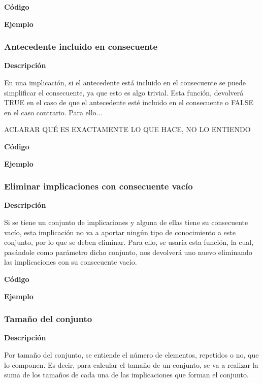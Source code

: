     \textbf{C\'odigo}



    \textbf{Ejemplo}



\subsubsection{Antecedente incluido en consecuente}

    \textbf{Descripci\'on}

    En una implicaci\'on, si el antecedente est\'a incluido en el consecuente se puede simplificar el consecuente, ya que 
    esto es algo trivial. Esta funci\'on, devolver\'a TRUE en el caso de que el antecedente est\'e incluido en el consecuente o 
    FALSE en el caso contrario. Para ello...

    ACLARAR QU\'E ES EXACTAMENTE LO QUE HACE, NO LO ENTIENDO

    \textbf{C\'odigo}


    \textbf{Ejemplo}


\subsubsection{Eliminar implicaciones con consecuente vac\'io}

    \textbf{Descripci\'on}

    Si se tiene un conjunto de implicaciones y alguna de ellas tiene su consecuente vac\'io, esta implicaci\'on no va a 
    aportar ning\'un tipo de conocimiento a este conjunto, por lo que se deben eliminar. Para ello, se usar\'ia esta funci\'on, 
    la cual, pas\'andole como par\'ametro dicho conjunto, nos devolver\'a uno nuevo eliminando las implicaciones con su consecuente 
    vac\'io.

    \textbf{C\'odigo}


    \textbf{Ejemplo}


\subsubsection{Tama\~no del conjunto}

    \textbf{Descripci\'on}

    Por tama\~no del conjunto, se entiende el n\'umero de elementos, repetidos o no, que lo componen. 
    Es decir, para calcular el tama\~no de un conjunto, se va a realizar la suma de los tama\~nos de cada una de 
    las implicaciones que forman el conjunto.


